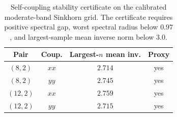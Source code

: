 \begin{table}[!htbp]
\centering
\small
\begin{tabular}{cccc}
\toprule
Pair & Coup. & Largest-$n$ mean inv. & Proxy \\
\midrule
$(8,2)$  & $xx$ & $2.714$ & yes \\
$(8,2)$  & $yy$ & $2.745$ & yes \\
$(12,2)$ & $xx$ & $2.759$ & yes \\
$(12,2)$ & $yy$ & $2.715$ & yes \\
\bottomrule
\end{tabular}
\caption{Self-coupling stability certificate on the calibrated moderate-band Sinkhorn grid. The certificate requires positive spectral gap, worst spectral radius below $0.97$, and largest-sample mean inverse norm below $3.0$.}
\label{tab:sinkhorn_self_coupling_certificate}
\end{table}
